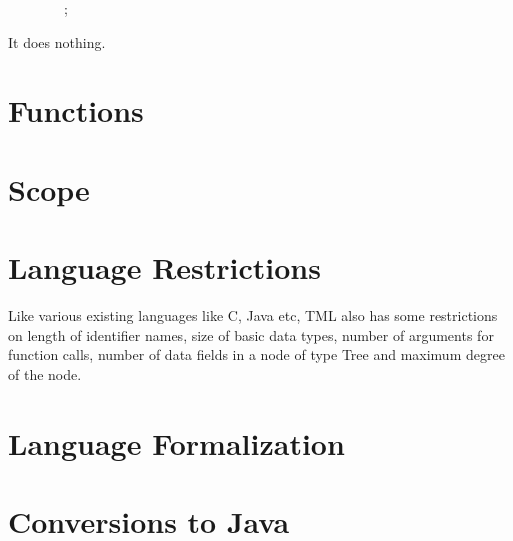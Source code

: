 \documentclass[12pt,psfig,a4]{article}
\begin{document}
\begin{code}
\begin{tabbing}
~~~~~~~~;
\end{tabbing}
\end{code}

It does nothing.


\section{Functions}

\section{Scope}

\section{Language Restrictions}
Like various existing languages like C, Java etc, TML also has some restrictions on length of identifier names, size of basic data types, number of arguments for function calls, number of data fields in a node of type Tree and maximum degree of the node.

\section{Language Formalization}

\section{Conversions to Java}






\end{document}
